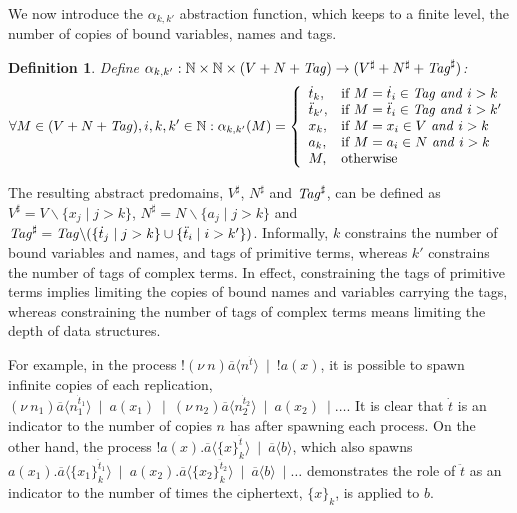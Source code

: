 \documentclass{entcs} \usepackage{entcsmacro}
\begin{document}
We now introduce the $\alpha_{k,k'}$ abstraction function, which keeps to a finite level, the number of copies of bound variables, names and tags.
\newtheorem{defen}{Definition}
\begin{defen}
Define $\alpha_{k,k'}:\mathbb{N}\times\mathbb{N}\times(V+N+\mbox{{\itshape Tag\/}})\to(V^\sharp+N^\sharp+\mbox{{\itshape Tag\/}}^\sharp)$:
\begin{equation*}
\forall M\in(V+N+\mbox{{\itshape Tag\/}}),i,k,k'\in\mathbb{N}:\alpha_{k,k'}(M)=\left\{\begin{array}{ll}
\dot{t}_{k},&\mbox{if }M=\dot{t}_i\in\mbox{{\itshape Tag\/}}\mbox{ {\itshape and\/} }i>k\\
\ddot{t}_{k'},&\mbox{if }M=\ddot{t}_i\in\mbox{{\itshape Tag\/}}\mbox{ {\itshape and\/} }i>k'\\
x_{k},&\mbox{if }M=x_i\in V\mbox{ {\itshape and\/} }i>k\\
a_{k},&\mbox{if }M=a_i\in N\mbox{ {\itshape and\/} }i>k\\
M,&\mbox{otherwise}
\end{array}\right.
\end{equation*}
\end{defen}
The resulting abstract predomains, $V^\sharp$, $N^\sharp$ and $\mbox{{\itshape Tag\/}}^\sharp$, can be defined as $V^\sharp=V\backslash\{x_j\mid j>k\}$, $N^\sharp=N\backslash\{a_j\mid j>k\}$ and $\mbox{{\itshape Tag\/}}^\sharp=\mbox{{\itshape Tag\/}}\backslash(\{\dot{t}_{j}\mid j>k\}\cup\{\ddot{t}_{i}\mid i>k'\})$.  Informally, $k$ constrains the number of bound variables and names, and tags of primitive terms, whereas $k'$ constrains the number of tags of complex terms.  In effect, constraining the tags of primitive terms implies limiting the copies of bound names and variables carrying the tags, whereas constraining the number of tags of complex terms means limiting the depth of data structures.

For example, in the process $!(\nu~\!n)\overline{a}\langle n^{\dot{t}}\rangle~\mid~!a(x)$, it is possible to spawn infinite copies of each replication, $(\nu~\!n_1)\overline{a}\langle n_1^{\dot{t}_1}\rangle~\mid~a(x_1)~\mid~(\nu~\!n_2)\overline{a}\langle n_2^{\dot{t}_2}\rangle~\mid~a(x_2)~\mid\ldots$.  It is clear that $\dot{t}$ is an indicator to the number of copies $n$ has after spawning each process.  On the other hand, the process $!a(x).\overline{a}\langle\{x\}_k^{\ddot{t}}\rangle~\mid~\overline{a}\langle b\rangle$, which also spawns $a(x_1).\overline{a}\langle\{x_1\}_k^{\ddot{t}_1}\rangle~\mid~a(x_2).\overline{a}\langle\{x_2\}_k^{\ddot{t}_2}\rangle~\mid~\overline{a}\langle b\rangle~\mid\ldots$ demonstrates the role of $\ddot{t}$ as an indicator to the number of times the ciphertext, $\{x\}_k$, is applied to $b$.
\end{document}
